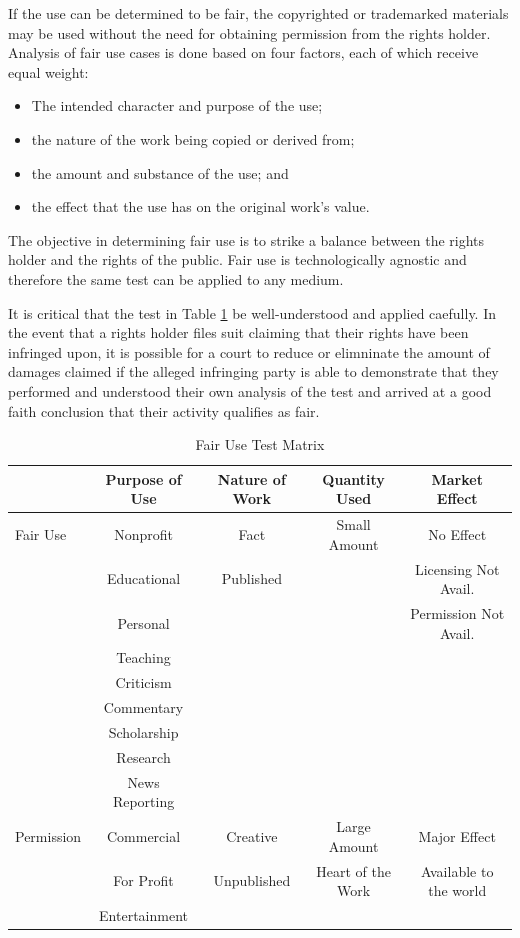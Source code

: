 \documentclass[letterpaper,11pt]{texMemo}
\begin{document}
  If the use can be determined to be fair, the copyrighted or trademarked materials may be used without the need for obtaining permission from the rights holder. Analysis of fair use cases is done based on four factors, each of which receive equal weight:
    \begin{itemize}
      \item The intended character and purpose of the use;
      \item the nature of the work being copied or derived from;
      \item the amount and substance of the use; and
      \item the effect that the use has on the original work's value.
    \end{itemize}
  The objective in determining fair use is to strike a balance between the rights holder and the rights of the public. Fair use is technologically agnostic and therefore the same test can be applied to any medium.

  It is critical that the test in Table \ref{tab:fair-use-test} be well-understood and applied caefully. In the event that a rights holder files suit claiming that their rights have been infringed upon, it is possible for a court to reduce or elimninate the amount of damages claimed if the alleged infringing party is able to demonstrate that they performed and understood their own analysis of the test and arrived at a good faith conclusion that their activity qualifies as fair.

  \begin{table}
  \centering
  \caption{Fair Use Test Matrix}
  \vspace{2ex}
  \begin{tabularx}{\linewidth}{|X|c|c|c|c|} \hline
   & Purpose of Use & Nature of Work & Quantity Used & Market Effect\\ \hline\hline
   Fair Use & Nonprofit & Fact & Small Amount & No Effect \\
   & Educational & Published & & Licensing Not Avail. \\
   & Personal & & & Permission Not Avail. \\
   & Teaching & & & \\
   & Criticism & & & \\
   & Commentary & & & \\
   & Scholarship & & & \\
   & Research & & & \\
   & News Reporting & & & \\ \hline \hline
  Permission & Commercial & Creative & Large Amount & Major Effect \\
    & For Profit & Unpublished & Heart of the Work & Available to the world \\
    & Entertainment & & & \\ \hline
\end{tabularx}
  \label{tab:fair-use-test}
  \end{table}
\end{document}
